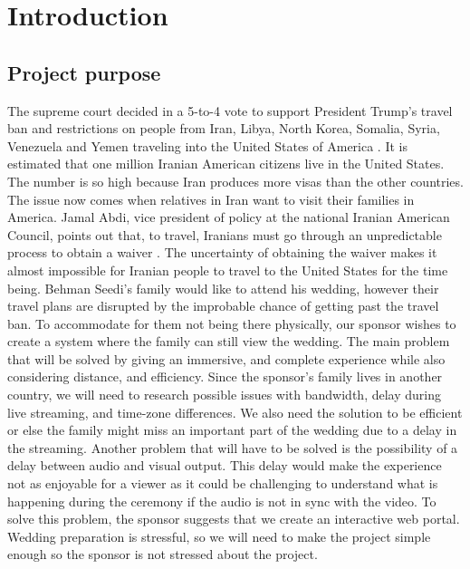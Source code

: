 \documentclass[onecolumn, draftclsnofoot,10pt, compsoc]{IEEEtran}
\begin{document}
\section{Introduction}
    \subsection{Project purpose}
    The supreme court decided in a 5-to-4 vote to support President Trump’s travel ban and restrictions on people from Iran, Libya, North Korea, Somalia, Syria, Venezuela and Yemen traveling into the United States of America \cite{IEEEhowto:TravelBan}. 
    It is estimated that one million Iranian American citizens live in the United States. 
    The number is so high because Iran produces more visas than the other countries. 
    The issue now comes when relatives in Iran want to visit their families in America.
    Jamal Abdi, vice president of policy at the national Iranian American Council, points out that, to travel, Iranians must go through an unpredictable process to obtain a waiver \cite{IEEEhowto:TravelBan}. 
    The uncertainty of obtaining the waiver makes it almost impossible for Iranian people to travel to the United States for the time being. 
    Behman Seedi's family would like to attend his wedding, however their travel plans are disrupted by the improbable chance of getting past the travel ban. 
    To accommodate for them not being there physically, our sponsor wishes to create a system where the family can still view the wedding.
    The main problem that will be solved by giving an immersive, and complete experience while also considering distance, and efficiency.
    Since the sponsor's family lives in another country, we will need to research possible issues with bandwidth, delay during live streaming, and time-zone differences.
    We also need the solution to be efficient or else the family might miss an important part of the wedding due to a delay in the streaming.
    Another problem that will have to be solved is the possibility of a delay between audio and visual output. 
    This delay would make the experience not as enjoyable for a viewer as it could be challenging to understand what is happening during the ceremony if the audio is not in sync with the video.
    To solve this problem, the sponsor suggests that we create an interactive web portal. 
    Wedding preparation is stressful, so we will need to make the project simple enough so the sponsor is not stressed about the project. 
\newline 
\end{document}
